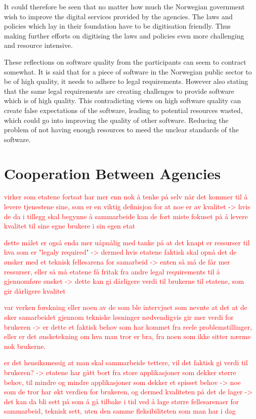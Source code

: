 It could therefore be seen that no matter how much the Norwegian government wish to improve the digital services provided by the agencies. The laws and policies which lay in their foundation have to be digitisation friendly. Thus making further efforts on digitising the laws and policies even more challenging and resource intensive.

These reflections on software quality from the participants can seem to contract somewhat. It is said that for a piece of software in the Norwegian public sector to be of high quality, it needs to adhere to legal requirements. However also stating that the same legal requirements are creating challenges to provide software which is of high quality. This contradicting views on high software quality can create false expectations of the software, leading to potential resources wasted, which could go into improving the quality of other software. Reducing the problem of not having enough resources to meed the unclear standards of the software.

\section{Cooperation Between Agencies}
\textcolor{red}{virker som etatene fortsat har mer enn nok å tenke på selv når det kommer til å levere tjenestene sine, som er en viktig definisjon for at noe er av kvalitet -> hvis de da i tillegg skal begynne å sammarbeide kan de fort miste fokuset på å levere kvalitet til sine egne brukere i sin egen etat}

\textcolor{red}{dette målet er også enda mer uåpnålig med tanke på at det knapt er ressurser til hva som er "legaly required" -> dermed hvis etatene faktisk skal opnå det de ønsker med et teknisk fellesarena for samarbeid -> enten så må de får mer ressurser, eller så må etatene få fritak fra andre legal requirements til å gjennomføre ønsket -> dette kan gi dårligere verdi til brukerne til etatene, som gir dårligere kvalitet}

\textcolor{red}{var verken forskning eller noen av de som ble intervjuet som nevnte at det at de øker samarbeidet gjennom tekniske løsninger nødvendigvis gir mer verdi for brukeren -> er dette et faktisk behov som har kommet fra reele problemstillinger, eller er det ønsketekning om hva man tror er bra, fra noen som ikke sitter nærme nok brukerne.}

\textcolor{red}{er det hensiksmessig at man skal sammarbeide tettere, vil det faktisk gi verdi til brukeren? -> etatene har gått bort fra store applikasjoner som dekker større behov, til mindre og mindre applikasjoner som dekker et spisset behov -> noe som de tror har økt verdien for brukeren, og dermed kvaliteten på det de lager -> det kan da bli sett på som å gå tilbake i tid ved å lage større fellesarenaer for sammarbeid, teknisk sett, uten den samme fleksibiliteten som man har i dag}

